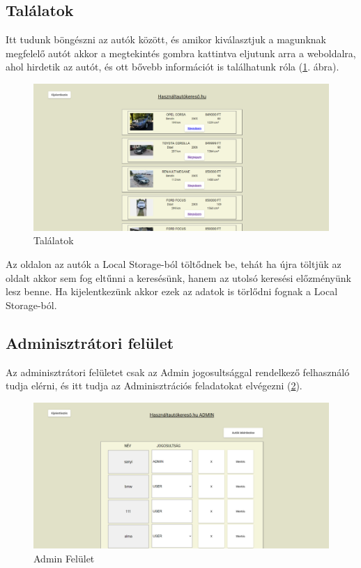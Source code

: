 \subsection{Találatok}

Itt tudunk böngészni az autók között, és amikor kiválasztjuk a magunknak megfelelő autót akkor a megtekintés gombra kattintva eljutunk arra a weboldalra, ahol hirdetik az autót, és ott bővebb információt is találhatunk róla (\ref{fig:Találatok}. ábra).

\begin{figure}[h]
\centering
\includegraphics[scale=0.9]{images/Talalatok_FE.png}
\caption{Találatok}
\label{fig:Találatok}
\end{figure}

Az oldalon az autók a Local Storage-ból töltődnek be, tehát ha újra töltjük az oldalt akkor sem fog eltűnni a keresésünk, hanem az utolsó keresési előzményünk lesz benne. Ha kijelentkezünk akkor ezek az adatok is törlődni fognak a Local Storage-ból.
\newpage

\subsection{Adminisztrátori felület}

Az adminisztrátori felületet csak az Admin jogosultsággal rendelkező felhasználó tudja elérni, és itt tudja az Adminisztrációs feladatokat elvégezni (\ref{fig:Admin}).

\begin{figure}[h]
\centering
\includegraphics[scale=0.9]{images/Admin_FE.png}
\caption{Admin Felület}
\label{fig:Admin}
\end{figure}

